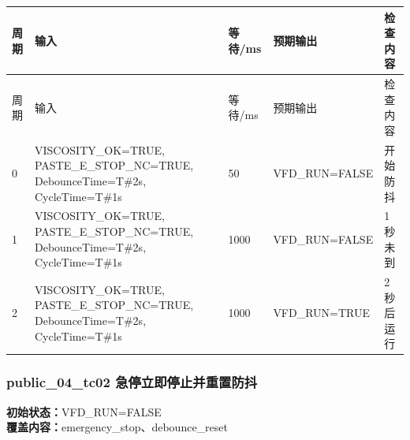 \begin{longtable}{L{1.0cm}L{4.7cm}L{1.4cm}L{4.0cm}L{2.1cm}}

\toprule

周期 & 输入 & 等待/ms & 预期输出 & 检查内容\\

\midrule

\endfirsthead

\toprule

周期 & 输入 & 等待/ms & 预期输出 & 检查内容\\

\midrule

\endhead

0 & VISCOSITY\_OK=TRUE, PASTE\_E\_STOP\_NC=TRUE, DebounceTime=T\#2s, CycleTime=T\#1s & 50 & VFD\_RUN=FALSE & 开始防抖\\

1 & VISCOSITY\_OK=TRUE, PASTE\_E\_STOP\_NC=TRUE, DebounceTime=T\#2s, CycleTime=T\#1s & 1000 & VFD\_RUN=FALSE & 1 秒未到\\

2 & VISCOSITY\_OK=TRUE, PASTE\_E\_STOP\_NC=TRUE, DebounceTime=T\#2s, CycleTime=T\#1s & 1000 & VFD\_RUN=TRUE & 2 秒后运行\\

\bottomrule

\end{longtable}

\subsubsection{{\ttfamily public\_04\_tc02} 急停立即停止并重置防抖}

\noindent\textbf{初始状态：}VFD\_RUN=FALSE\\

\textbf{覆盖内容：}emergency\_stop、debounce\_reset

